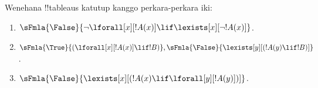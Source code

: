 \documentclass[../../../include/open-logic-section]{subfiles}
\begin{document}
\begin{prob}
Wenehana !!{tableau}s katutup kanggo perkara-perkara iki:
\begin{enumerate}
\item $\sFmla{\False}{\lnot\lforall[x][!A(x)] \lif \lexists[x][\lnot!A(x)]}$.
\item $\sFmla{\True}{(\lforall[x][!A(x)] \lif !B)}, \sFmla{\False}{\lexists[y][(!A(y) \lif !B)]}$.
\item $\sFmla{\False}{\lexists[x][(!A(x) \lif \lforall[y][!A(y)])]}$.
\end{enumerate}
\end{prob}
\end{document}
